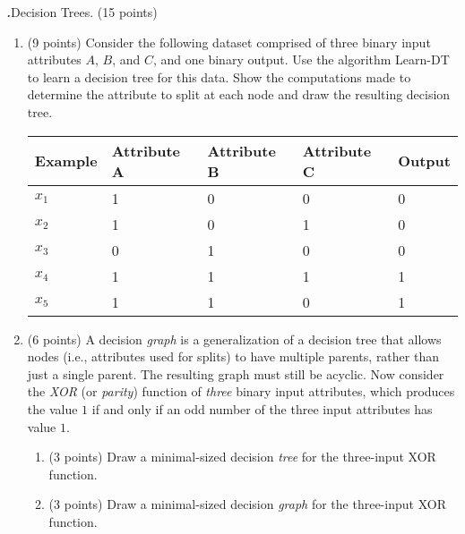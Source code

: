 \documentclass[12pt]{amsart}
\newenvironment{statement}[1]{\smallskip\noindent\color[rgb]{0.0,0.0,0.0} {\bf #1.}}{}
\newcommand{\1}{\mathds{1}}
\begin{document}
\newpage
\begin{statement}{3}
\emph{Decision Trees.} (15 points) 
\begin{enumerate}
    \item (9 points) Consider the following dataset comprised of three binary input attributes $A$, $B$, and $C$, and one binary output. Use the algorithm Learn-DT to learn a decision tree for this data. Show the computations made to determine the attribute to split at each node and draw the resulting decision tree.
    
\begin{table}[H]
\begin{tabular}{lllll}
\hline
\multicolumn{1}{|l|}{Example} & \multicolumn{1}{l|}{Attribute A} & \multicolumn{1}{l|}{Attribute B} & \multicolumn{1}{l|}{Attribute C} & \multicolumn{1}{l|}{Output} \\ \hline
\multicolumn{1}{|l|}{$x_1$}       & \multicolumn{1}{l|}{1}           & \multicolumn{1}{l|}{0}           & \multicolumn{1}{l|}{0}           & \multicolumn{1}{l|}{0}      \\ \hline
\multicolumn{1}{|l|}{$x_2$}       & \multicolumn{1}{l|}{1}           & \multicolumn{1}{l|}{0}           & \multicolumn{1}{l|}{1}           & \multicolumn{1}{l|}{0}      \\ \hline
\multicolumn{1}{|l|}{$x_3$}       & \multicolumn{1}{l|}{0}           & \multicolumn{1}{l|}{1}           & \multicolumn{1}{l|}{0}           & \multicolumn{1}{l|}{0}      \\ \hline
\multicolumn{1}{|l|}{$x_4$}       & \multicolumn{1}{l|}{1}           & \multicolumn{1}{l|}{1}           & \multicolumn{1}{l|}{1}           & \multicolumn{1}{l|}{1}      \\ \hline
\multicolumn{1}{|l|}{$x_5$}       & \multicolumn{1}{l|}{1}           & \multicolumn{1}{l|}{1}           & \multicolumn{1}{l|}{0}           & \multicolumn{1}{l|}{1}      \\ \hline                        
\end{tabular}
\end{table}
    
    \item (6 points) A decision \textit{graph} is a generalization of a decision tree that allows nodes (i.e., attributes used for splits) to have multiple parents, rather than just a single parent. The resulting graph must still be acyclic. Now consider the \textit{XOR} (or \textit{parity}) function of \textit{three} binary input attributes, which produces the value $1$ if and only if an odd number of the three input attributes has value $1$. 
    \begin{enumerate}
        \item (3 points) Draw a minimal-sized decision \textit{tree} for the three-input XOR function.
        \item (3 points) Draw a minimal-sized decision \textit{graph} for the three-input XOR function.
    \end{enumerate}
\end{enumerate}
\end{statement}
\end{document}
